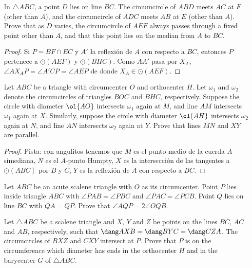 \begin{probEG}
	In $\triangle ABC$, a point $D$ lies on line $BC$. The circumcircle of $ABD$ meets $AC$ at $F$ (other than $A$), and the circumcircle of $ADC$ meets $AB$ at $E$ (other than $A$). Prove that as $D$ varies, the circumcircle of $AEF$ always passes through a fixed point other than $A$, and that this point lies on the median from $A$ to $BC$.
\end{probEG}

\begin{proof}
	Si $P=BF\cap EC$ y $A'$ la reflexión de $A$ con respecto a $BC$, entonces $P$ pertenece a $\odot(AEF)$ y $\odot(BHC)$. Como $AA'$ pasa por $X_A$, $\angle AX_AP=\angle A'CP=\angle AEP$ de donde $X_A\in\odot(AEF)$.
\end{proof}

\begin{probEG}[ELMO 2014/5]
	Let $ABC$ be a triangle with circumcenter $O$ and orthocenter $H$. Let $\omega_1$ and $\omega_2$ denote the circumcircles of triangles $BOC$ and $BHC$, respectively. Suppose the circle with diameter $\ol{AO}$ intersects $\omega_1$ again at $M$, and line $AM$ intersects $\omega_1$ again at $X$. Similarly, suppose the circle with diameter $\ol{AH}$ intersects $\omega_2$ again at $N$, and line $AN$ intersects $\omega_2$ again at $Y$. Prove that lines $MN$ and $XY$ are parallel.
\end{probEG}

\begin{proof}
	Pista: con angulitos tenemos que $M$ es el punto medio de la cuerda $A$-simediana, $N$ es el $A$-punto Humpty, $X$ es la intersección de las tangentes a $\odot(ABC)$ por $B$ y $C$, $Y$ es la reflexión de $A$ con respecto a $BC$.
\end{proof}

\begin{probEG}
	Let $ABC$ be an acute scalene triangle with $O$ as its circumcenter. Point $P$ lies inside triangle $ABC$ with $\angle PAB=\angle PBC$ and $\angle PAC=\angle PCB$. Point $Q$ lies on line $BC$ with $QA=QP$. Prove that $\angle AQP=2\angle OQB$.
\end{probEG}

\begin{probEG}
	Let $\triangle ABC$ be a scalene triangle and $X$, $Y$ and $Z$ be points on the lines $BC$, $AC$ and $AB$, respectively, such that $\dang AXB=\dang BYC=\dang CZA$. The circumcircles of $BXZ$ and $CXY$ intersect at $P$. Prove that $P$ is on the circumference which diameter has ends in the orthocenter $H$ and in the barycenter $G$ of $\triangle ABC$.
\end{probEG}


